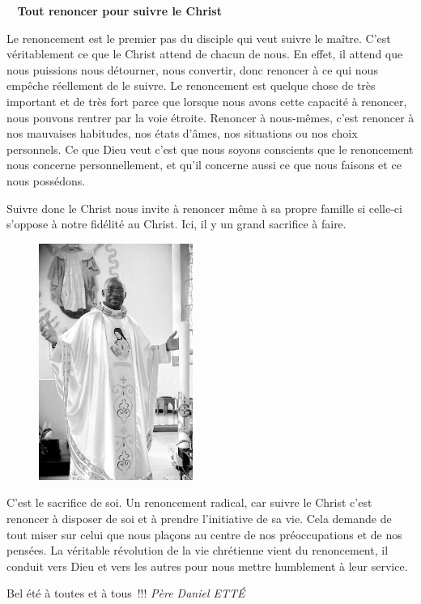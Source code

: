  \begin{center}
 \textbf{
\og 
Tout renoncer pour suivre le Christ
 \fg{}
 }
 \end{center}

 Le renoncement est le premier pas du disciple qui veut suivre le maître. C’est véritablement ce que le Christ attend de chacun de nous. En effet, il attend que nous puissions nous détourner, nous convertir, donc renoncer à ce qui nous empêche réellement de le suivre. Le renoncement est quelque chose de très important et de très fort parce que lorsque nous avons cette capacité à renoncer, nous pouvons rentrer par la voie étroite. Renoncer à nous-mêmes, c’est renoncer à nos mauvaises habitudes, nos états d’âmes, nos situations ou nos choix personnels. Ce que Dieu veut c’est que nous soyons conscients que le renoncement nous concerne personnellement, et qu’il concerne aussi ce que nous faisons et ce nous possédons.


Suivre donc le Christ nous invite à renoncer même à sa propre famille si celle-ci s’oppose à notre fidélité au Christ.
Ici, il y un grand sacrifice à faire.
\begin{figure}
\vspace{-0.4cm}
	\includegraphics[scale=1.20]{../images/standing_daniel}
\end{figure}
C’est le sacrifice de soi.
Un renoncement radical, car suivre le Christ c’est renoncer à disposer de soi et à prendre l’initiative de sa vie.
Cela demande de tout miser sur celui que nous plaçons au centre de nos préoccupations et de nos pensées.
La véritable révolution de la vie chrétienne vient du renoncement, il conduit vers Dieu et vers les autres pour nous mettre humblement à leur service. 

\begin{flushright}
Bel été à toutes et à tous !!!
\textit{Père  Daniel  ETTÉ}
\end{flushright}

